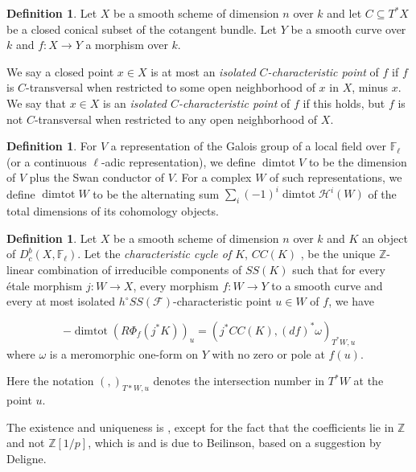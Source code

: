 \documentclass[12pt]{amsart}
\theoremstyle{definition}
\newtheorem{definition}[theorem]{Definition}
\theoremstyle{remark}
\begin{document}
\begin{definition} \cite[Definition 5.3(1)]{saito1} Let $X$ be a smooth scheme of dimension $n$ over $k$  and let $C\subseteq T^* X$ be a closed conical subset of the cotangent bundle. Let $Y$ be a smooth curve over $k$ and $f: X\to Y$ a morphism over $k$. 

We say a closed point $x \in X$ is at most an \emph{isolated $C$-characteristic point} of $f$ if $f$ is $C$-transversal when restricted to some open neighborhood of $x$ in $X$, minus $x$.  We say that $x\in X$ is an \emph{isolated $C$-characteristic point} of $f$ if this holds, but $f$ is not $C$-transversal when restricted to any open neighborhood of $X$. \end{definition}

\begin{definition} For $V$ a representation of the Galois group of a local field over $\mathbb F_\ell$ (or a continuous $\ell$-adic representation), we define $\operatorname{dimtot} V$ to be the dimension of $V$ plus the Swan conductor of $V$. For a complex $W$ of such representations, we define $\operatorname{dimtot}W $ to be the alternating sum $\sum_i (-1)^i \operatorname{dimtot} \mathcal H^i(W)$ of the total dimensions of its cohomology objects. \end{definition}

\begin{definition}\cite[Definition 5.10]{saito1} Let $X$ be a smooth scheme of dimension $n$ over $k$ and $K$ an object of $D^b_c(X, \mathbb F_\ell)$. Let the \emph{characteristic cycle of $K$}, $CC(K)$ , be the unique $\mathbb Z$-linear combination of irreducible components of $SS(K)$ such that for every \'{e}tale morphism $j: W \to X$, every morphism $f: W\to Y$ to a smooth curve and every at most isolated $h^\circ SS(\mathcal F)$-characteristic point $u \in W$ of $f$, we have

\[ - \operatorname{dimtot} \left( R \Phi_f(j^* K) \right)_u =  (j^* CC(K), (df)^*\omega )_{T^*W,u} \] where $\omega$ is a meromorphic one-form on $Y$ with no zero or pole at $f(u)$.

\end{definition}

Here the notation $(,)_{T*W ,u}$ denotes the intersection number in $T^* W$ at the point $u$.

The existence and uniqueness is \cite[Theorem 5.9]{saito1}, except for the fact that the coefficients lie in $\mathbb Z$ and not $\mathbb Z[1/p]$, which is \cite[Theorem 5.18]{saito1} and is due to Beilinson, based on a suggestion by Deligne.
\end{document}
